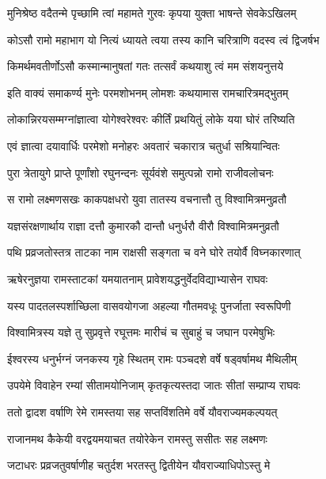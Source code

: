
\twolineshloka
{मुनिश्रेष्ठ वदैतन्मे पृच्छामि त्वां महामते}
{गुरवः कृपया युक्ता भाषन्ते सेवकेऽखिलम्}%

\twolineshloka
{कोऽसौ रामो महाभाग यो नित्यं ध्यायते त्वया}
{तस्य कानि चरित्राणि वदस्व त्वं द्विजर्षभ}%

\twolineshloka
{किमर्थमवतीर्णोऽसौ कस्मान्मानुषतां गतः}
{तत्सर्वं कथयाशु त्वं मम संशयनुत्तये}%


\twolineshloka
{इति वाक्यं समाकर्ण्य मुनेः परमशोभनम्}
{लोमशः कथयामास रामचारित्रमद्भुतम्}%

\twolineshloka
{लोकान्निरयसम्मग्नांज्ञात्वा योगेश्वरेश्वरः}
{कीर्तिं प्रथयितुं लोके यया घोरं तरिष्यति}%

\twolineshloka
{एवं ज्ञात्वा दयावार्धिः परमेशो मनोहरः}
{अवतारं चकारात्र चतुर्धा सश्रियान्वितः}%

\twolineshloka
{पुरा त्रेतायुगे प्राप्ते पूर्णांशो रघुनन्दनः}
{सूर्यवंशे समुत्पन्नो रामो राजीवलोचनः}%

\twolineshloka
{स रामो लक्ष्मणसखः काकपक्षधरो युवा}
{तातस्य वचनात्तौ तु विश्वामित्रमनुव्रतौ}%

\twolineshloka
{यज्ञसंरक्षणार्थाय राज्ञा दत्तौ कुमारकौ}
{दान्तौ धनुर्धरौ वीरौ विश्वामित्रमनुव्रतौ}%

\twolineshloka
{पथि प्रव्रजतोस्तत्र ताटका नाम राक्षसी}
{सङ्गता च वने घोरे तयोर्वै विघ्नकारणात्}%

\twolineshloka
{ऋषेरनुज्ञया रामस्ताटकां यमयातनाम्}
{प्रावेशयद्धनुर्वेदविद्याभ्यासेन राघवः}%

\twolineshloka
{यस्य पादतलस्पर्शाच्छिला वासवयोगजा}
{अहल्या गौतमवधूः पुनर्जाता स्वरूपिणी}%

\twolineshloka
{विश्वामित्रस्य यज्ञे तु सुप्रवृत्ते रघूत्तमः}
{मारीचं च सुबाहुं च जघान परमेषुभिः}%

\twolineshloka
{ईश्वरस्य धनुर्भग्नं जनकस्य गृहे स्थितम्}
{रामः पञ्चदशे वर्षे षड्वर्षामथ मैथिलीम्}%

\twolineshloka
{उपयेमे विवाहेन रम्यां सीतामयोनिजाम्}
{कृतकृत्यस्तदा जातः सीतां सम्प्राप्य राघवः}%

\twolineshloka
{ततो द्वादश वर्षाणि रेमे रामस्तया सह}
{सप्तविंशतिमे वर्षे यौवराज्यमकल्पयत्}%

\twolineshloka
{राजानमथ कैकेयी वरद्वयमयाचत}
{तयोरेकेन रामस्तु ससीतः सह लक्ष्मणः}%

\twolineshloka
{जटाधरः प्रव्रजतुवर्षाणीह चतुर्दश}
{भरतस्तु द्वितीयेन यौवराज्याधिपोऽस्तु मे}%

